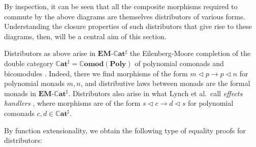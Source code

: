 \documentclass[
  11pt,
  oneside,
  article]{memoir}
\theoremstyle{definition}
\theoremstyle{plain}
\newenvironment{remark}
  {\pushQED{\qed}\renewcommand{\qedsymbol}{$\lozenge$}\remarkx}
  {\popQED\endremarkx}
\newcommand{\Cat}[1]{\mathbf{#1}}%
\newcommand{\ccatsharp}{\mathbb{C}\Cat{at}^{\sharp}}
\newcommand{\poly}{\Cat{Poly}}
\newcommand{\0}{\textsf{0}}
\newcommand{\1}{\tn{\textsf{1}}}
\newcommand{\tri}{\mathbin{\triangleleft}}
\begin{document}
By inspection, it can be seen that all the composite morphisms required
to commute by the above diagrams are themselves distributors of various
forms. Understanding the closure properties of such distributors that
give rise to these diagrams, then, will be a central aim of this
section.

\begin{remark}
Distributors as above arise in $\Cat{EM}$-$\ccatsharp$ the Eilenberg-Moore completion \cite{lack2002formal} of the double category $\ccatsharp=\mathbb{C}\Cat{omod}(\poly)$ of polynomial comonads and bicomodules \cite{shapiro2024polynomial}. Indeed, there we find morphisms of the form $m\tri p\to p\tri n$ for polynomial monads $m,n$, and distributive laws between monads are the formal monads in $\Cat{EM}$-$\ccatsharp$. Distributors also arise in what Lynch et al.\ call \emph{effects handlers} \cite{lynch2023concepts}, where morphisms are of the form $s\tri c\to d\tri s$ for polynomial comonads $c,d\in\ccatsharp$.
\end{remark}

By function extensionality, we obtain the following type of equality
proofs for distributors:
\end{document}
